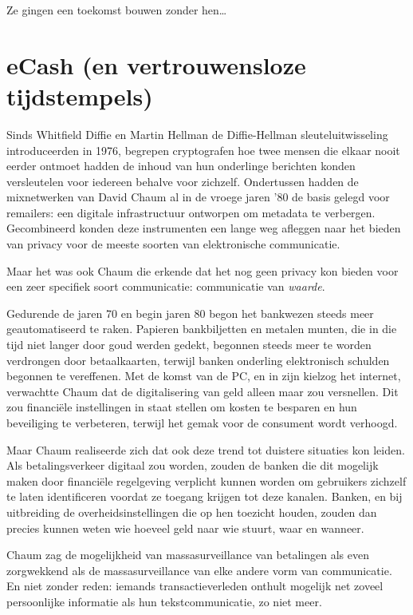 \documentclass[smalldemyvopaper,11pt,twoside,onecolumn,openright,extrafontsizes,hidelinks]{memoir}
\begin{document}
Ze gingen een toekomst bouwen zonder hen\ldots{}

\chapter{eCash (en vertrouwensloze
tijdstempels)}\label{ecash-en-vertrouwensloze-tijdstempels}

Sinds Whitfield Diffie en Martin Hellman de Diffie-Hellman
sleuteluitwisseling introduceerden in 1976, begrepen cryptografen hoe
twee mensen die elkaar nooit eerder ontmoet hadden de inhoud van hun
onderlinge berichten konden versleutelen voor iedereen behalve voor
zichzelf. Ondertussen hadden de mixnetwerken van David Chaum al in de
vroege jaren '80 de basis gelegd voor remailers: een digitale
infrastructuur ontworpen om metadata te verbergen. Gecombineerd konden
deze instrumenten een lange weg afleggen naar het bieden van privacy
voor de meeste soorten van elektronische communicatie.

Maar het was ook Chaum die erkende dat het nog geen privacy kon bieden
voor een zeer specifiek soort communicatie: communicatie van
\emph{waarde}.

Gedurende de jaren 70 en begin jaren 80 begon het bankwezen steeds meer
geautomatiseerd te raken. Papieren bankbiljetten en metalen munten, die
in die tijd niet langer door goud werden gedekt, begonnen steeds meer te
worden verdrongen door betaalkaarten, terwijl banken onderling
elektronisch schulden begonnen te vereffenen. Met de komst van de PC, en
in zijn kielzog het internet, verwachtte Chaum dat de digitalisering van
geld alleen maar zou versnellen. Dit zou financiële instellingen in
staat stellen om kosten te besparen en hun beveiliging te verbeteren,
terwijl het gemak voor de consument wordt verhoogd.

Maar Chaum realiseerde zich dat ook deze trend tot duistere situaties
kon leiden. Als betalingsverkeer digitaal zou worden, zouden de banken
die dit mogelijk maken door financiële regelgeving verplicht kunnen
worden om gebruikers zichzelf te laten identificeren voordat ze toegang
krijgen tot deze kanalen. Banken, en bij uitbreiding de
overheidsinstellingen die op hen toezicht houden, zouden dan precies
kunnen weten wie hoeveel geld naar wie stuurt, waar en wanneer.

Chaum zag de mogelijkheid van massasurveillance van betalingen als even
zorgwekkend als de massasurveillance van elke andere vorm van
communicatie. En niet zonder reden: iemands transactieverleden onthult
mogelijk net zoveel persoonlijke informatie als hun tekstcommunicatie,
zo niet meer.
\end{document}
